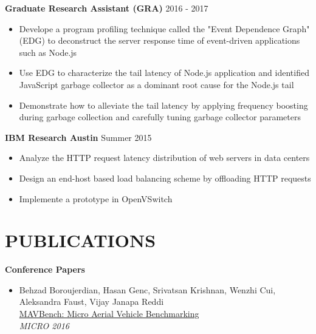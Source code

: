 \documentclass[margin, 9pt]{res} %
\begin{document}
\begin{resume}
\medskip
{\textbf{Graduate Research Assistant (GRA)}} \hfill{2016 - 2017}\\
\vspace*{-10pt}
\begin{itemize}[leftmargin=*] \itemsep -3pt
\vspace*{-5pt}
	\item Develope a program profiling technique called the "Event Dependence Graph" (EDG) to deconstruct the server response time of event-driven applications such as Node.js
	\item Use EDG to characterize the tail latency of Node.js application and identified JavaScript garbage collector as a dominant root cause for the Node.js tail
	\item Demonstrate how to alleviate the tail latency by applying frequency boosting during garbage collection and carefully tuning garbage collector parameters
\end{itemize}

\medskip
{\textbf{IBM Research Austin}} \hfill{Summer 2015}\\
\vspace*{-10pt}
\begin{itemize}[leftmargin=*] \itemsep -3pt
\vspace*{-5pt}
	\item Analyze the HTTP request latency distribution of web servers in data centers
	\item Design an end-host based load balancing scheme by offloading HTTP requests
	\item Implemente a prototype in OpenVSwitch
\end{itemize}

 
\section{PUBLICATIONS}

{\large\textbf{Conference Papers}}

\begin{itemize}[leftmargin=*] \itemsep -3pt
	\item Behzad Boroujerdian, Hasan Genc, Srivatsan Krishnan, Wenzhi Cui, Aleksandra Faust, Vijay Janapa Reddi\\
          \href{https://edge.seas.harvard.edu/files/zad-18-micro-mavbench.pdf}{MAVBench: Micro Aerial Vehicle Benchmarking}\\
          \textit{MICRO 2016}


\end{itemize}
\end{resume}
\end{document}
